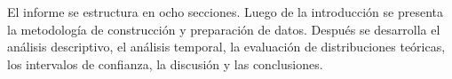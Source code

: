 El informe se estructura en ocho secciones. Luego de la introducción se presenta la metodología de construcción y preparación de datos. Después se desarrolla el análisis descriptivo, el análisis temporal, la evaluación de distribuciones teóricas, los intervalos de confianza, la discusión y las conclusiones.

